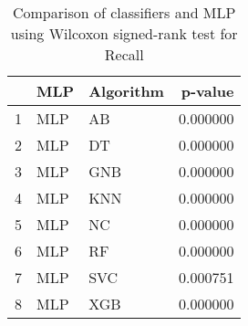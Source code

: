 \begin{table}
\footnotesize
\caption{Comparison of classifiers and MLP using Wilcoxon signed-rank test for Recall}
\label{tab:MLP wilcoxon Recall comparison}
\begin{tabular}{lllr}
\hline
 & MLP & Algorithm & p-value \\
\hline
1 & MLP & AB & 0.000000 \\
2 & MLP & DT & 0.000000 \\
3 & MLP & GNB & 0.000000 \\
4 & MLP & KNN & 0.000000 \\
5 & MLP & NC & 0.000000 \\
6 & MLP & RF & 0.000000 \\
7 & MLP & SVC & 0.000751 \\
8 & MLP & XGB & 0.000000 \\
\hline
\end{tabular}
\end{table}
